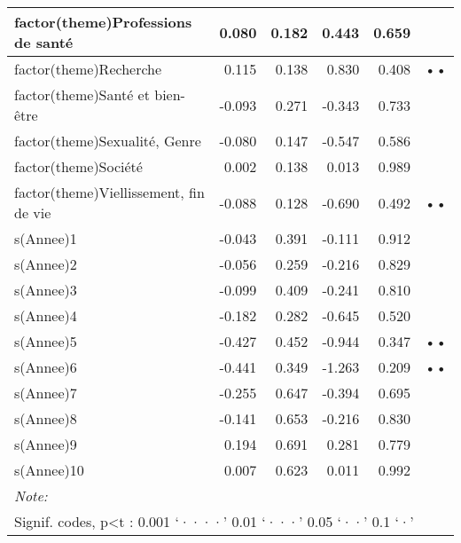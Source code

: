 \documentclass[
  letterpaper,
  DIV=11,
  numbers=noendperiod]{scrartcl}
\begin{document}
\begin{table}
\begin{minipage}[t]{\linewidth}
{\begin{tabular}[t]{l|r|r|r|r|l}
\hline
factor(theme)Professions de santé & 0.080 & 0.182 & 0.443 & 0.659 & \\
\hline
factor(theme)Recherche & 0.115 & 0.138 & 0.830 & 0.408 & ••\\
\hline
factor(theme)Santé et bien-être & -0.093 & 0.271 & -0.343 & 0.733 & \\
\hline
factor(theme)Sexualité, Genre & -0.080 & 0.147 & -0.547 & 0.586 & \\
\hline
factor(theme)Société & 0.002 & 0.138 & 0.013 & 0.989 & \\
\hline
factor(theme)Viellissement, fin de vie & -0.088 & 0.128 & -0.690 & 0.492 & ••\\
\hline
s(Annee)1 & -0.043 & 0.391 & -0.111 & 0.912 & \\
\hline
s(Annee)2 & -0.056 & 0.259 & -0.216 & 0.829 & \\
\hline
s(Annee)3 & -0.099 & 0.409 & -0.241 & 0.810 & \\
\hline
s(Annee)4 & -0.182 & 0.282 & -0.645 & 0.520 & \\
\hline
s(Annee)5 & -0.427 & 0.452 & -0.944 & 0.347 & ••\\
\hline
s(Annee)6 & -0.441 & 0.349 & -1.263 & 0.209 & ••\\
\hline
s(Annee)7 & -0.255 & 0.647 & -0.394 & 0.695 & \\
\hline
s(Annee)8 & -0.141 & 0.653 & -0.216 & 0.830 & \\
\hline
s(Annee)9 & 0.194 & 0.691 & 0.281 & 0.779 & \\
\hline
s(Annee)10 & 0.007 & 0.623 & 0.011 & 0.992 & \\
\hline
\multicolumn{6}{l}{\rule{0pt}{1em}\textit{Note: }}\\
\multicolumn{6}{l}{\rule{0pt}{1em}Signif. codes, p<t : 0.001 ‘····’ 0.01 ‘···’ 0.05 ‘··’ 0.1 ‘·’ }\\
\end{tabular}

}

\end{minipage}%
\newline
\begin{minipage}[t]{\linewidth}

{\centering 

}
\end{minipage}
\end{table}
\end{document}
